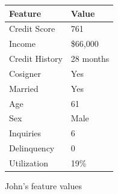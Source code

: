 \documentclass[mnsc,blindrev]{informs3}
\newlength\mylenC
\newlength\mylenD
\begin{document}
\settowidth{} 
\setlength{}
    \begin{figure}[ht!]
    \small
        \centering
            \begin{subfigure}[t]{.35\textwidth}
              \centering
                \begin{tabular}[b]{l|l}
                \toprule
                \textbf{Feature} & \textbf{Value} \\ \hline
                Credit Score     & 761            \\
                Income           & \$66,000       \\
                Credit History   & 28 months      \\
                Cosigner         & Yes            \\
                Married          & Yes            \\
                Age              & 61             \\
                Sex              & Male \\
                Inquiries        & 6              \\
                Delinquency      & 0              \\
                Utilization      & 19\%           \\
                \bottomrule
                \end{tabular}
              \caption{John's feature values}
              \label{fig:shap_ex_feat}
            \end{subfigure}%
            \hfill%
            \begin{subfigure}[t]{.65\textwidth}
              \centering




\end{subfigure}
\end{figure}
\end{document}
